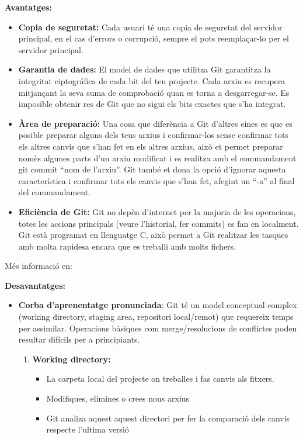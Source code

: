 \begin{enumerate}
\textbf{Avantatges:}

\begin{itemize}
 \item \textbf{Copia de seguretat:} Cada usuari té una copia de seguretat del servidor principal, en el cas d'errors o corrupció, sempre el pots reemplaçar-lo per el servidor principal.
 \item \textbf{Garantia de dades:} El model de dades que utilitza Git garantitza la integritat ciptográfica de cada bit del teu projecte. Cada arxiu es recupera mitjançant la seva suma de comprobació quan es torna a desgarregar-se. Es imposible obtenir res de Git que no sigui els bits exactes que s'ha integrat.
 \item \textbf{Àrea de preparació:} Una cosa que diferència a Git d'altres eines es que es posible preparar alguns dels teus arxius i confirmar-los sense confirmar tots els altres canvis que s'han fet en els altres arxius, això et permet preparar nomès algunes parts d'un arxiu modificat i es realitza amb el commandament git commit ``nom de l'arxiu''. Git també et dona la opció d'ignorar aquesta característica i confirmar tots els canvis que s'han fet, afegint un ``-a'' al final del commandament.
 \item \textbf{Eficiència de Git:} Git no depèn d'internet per la majoria de les operacions, totes les accions principals (veure l'historial, fer commits) es fan en localment. Git està programat en llenguatge C, això permet a Git realitzar les tasques amb molta rapidesa encara que es treballi amb molts fichers.
\end{itemize}
Més informació en: \cite{PaginaoficialdelGit}

\textbf{Desavantatges:}
\begin{itemize}



\item \textbf{Corba d'aprenentatge pronunciada}: Git té un model conceptual complex (working directory, staging area, repositori local/remot) que requereix temps per assimilar. Operacions bàsiques com merge/resolucions de conflictes poden resultar difícils per a principiants.

      \begin{enumerate}
        \item \textbf{Working directory:}
         \begin{itemize}
            \item La carpeta local del projecte on treballes i fas canvis als fitxers.
            \item Modifiques, elimines o crees nous arxius
            \item Git analiza aquest aquest directori per fer la comparació dels canvis respecte l'ultima versió
          \end{itemize}


\end{enumerate}
\end{itemize}
\end{enumerate}
